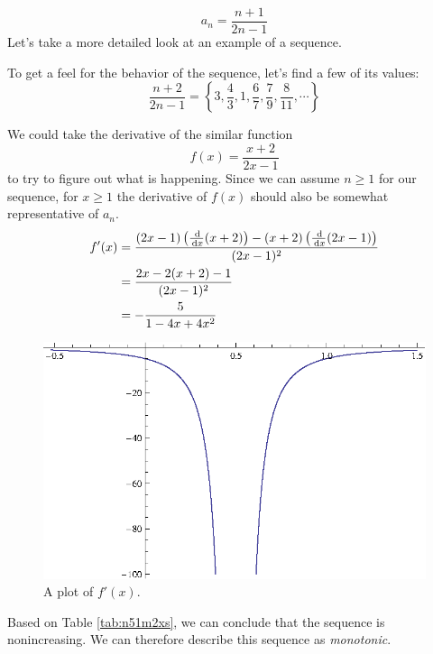 \begin{ex}\label{ex:bigsequence}
  \[ a_n=\frac{n+1}{2n-1} \]
    Let's take a more detailed look at an example of a sequence.

    To get a feel for the behavior of the sequence, let's find a few of its
    values:
    \[ \frac{n+2}{2n-1} =
      \left\{3,\frac{4}{3},1,\frac{6}{7},\frac{7}{9},\frac{8}{11}, \cdots \right\} \]


    We could take the derivative of the similar function
    \[ f(x)=\frac{x+2}{2x-1} \]
    to try to figure out what is happening. Since we can assume \(n \geq 1\) for
    our sequence, for \(x \geq 1\) the derivative of \(f(x)\) should also be
    somewhat representative of \(a_n\).
    \begin{align*}
      f'(x)&= \frac{(2 x-1) \left(\frac{\,\mathrm{d}}{\,\mathrm{d} x}(x+2)\right)-(x+2)
      \left(\frac{\,\mathrm{d}}{\,\mathrm{d} x}(2 x-1)\right)}{(2 x-1)^2}
      \\
      &=\frac{2 x-2 (x+2)-1}{(2 x-1)^2} \\
      &=-\frac{5}{1-4 x+4 x^2}
    \end{align*}
    \begin{table}[h]
      \centering
      \caption{A sign diagram for \(f'(x)\).}
      \label{tab:n51m2xs}
    \end{table}
    \begin{figure}[h]
      \begin{center}
        \includegraphics{graphs/n51m2xs}
      \end{center}
      \caption{A plot of \(f'(x)\).}
      \label{fig:n51m2xs}
    \end{figure}
    Based on Table \ref{tab:n51m2xs}, we can conclude that the sequence is
    nonincreasing. We can therefore describe this sequence as \emph{monotonic}.


\end{ex}
